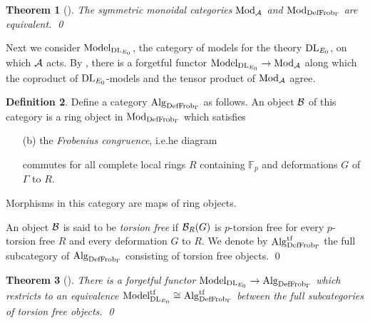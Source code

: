 \documentclass{gtpart}
\newtheorem{thm}{Theorem}
\theoremstyle{definition}
\newtheorem{defn}[thm]{Definition}
\theoremstyle{remark}
\newcommand{\mb}[1]{\mathbb{#1}}
\newcommand{\DL}{{\rm DL}}
\newcommand{\CA}{{\cal A}}
\newcommand{\Mod}{{\rm Mod}}
\newcommand{\Alg}{{\rm Alg}}
\newcommand{\Frob}{{\rm Frob}}
\newcommand{\DF}{{{\rm DefFrob}_\Gamma}}
\newcommand{\Model}{{\rm Model}}
\begin{document}
\begin{thm}[{\cite[pre-theorem 16.4]{lpo}}]
 The symmetric monoidal categories $\Mod_\CA$ and $\Mod_\DF$ are equivalent.  
 \qed
\end{thm}

Next we consider $\Model_{\DL_{E_0}}$, the category of models for the theory 
$\DL_{E_0}$, on which $\CA$ acts.  By \cite[proposition 7.6]{lpo}, there is a 
forgetful functor $\Model_{\DL_{E_0}} \to \Mod_\CA$ along which the coproduct 
of $\DL_{E_0}$-models and the tensor product of $\Mod_\CA$ agree.  
\begin{defn}
\label{def:alg}
 Define a category $\Alg_\DF$ as follows.  An object $\cal B$ of this category 
 is a ring object in $\Mod_\DF$ which satisfies 
 \begin{enumerate}
  \item[(b)] the {\em Frobenius congruence}, i.e.he diagram 
  \begin{center}
  \end{center}
  commutes for all complete local rings $R$ containing ${\mb F}_p$ and 
  deformations $G$ of $\Gamma$ to $R$.  
 \end{enumerate}

 Morphisms in this category are maps of ring objects.  

 An object ${\cal B}$ is said to be {\em torsion free} if  ${\cal B}_R(G)$ is 
 $p$-torsion free for every $p$-torsion free $R$ and every deformation $G$ to 
 $R$.  We denote by $\Alg_\DF^{\rm tf}$ the full subcategory of $\Alg_\DF$ 
 consisting of torsion free objects.  \qed
\end{defn}

\begin{thm}[{\cite[pre-theorem 16.5]{lpo}}]
 There is a forgetful functor $\Model_{\DL_{E_0}} \to \Alg_\DF$ which 
 restricts to an equivalence $\Model_{\DL_{E_0}}^{\rm tf} \cong 
 \Alg_\DF^{\rm tf}$ between the full subcategories of torsion free objects.  
 \qed
\end{thm}
\end{document}
